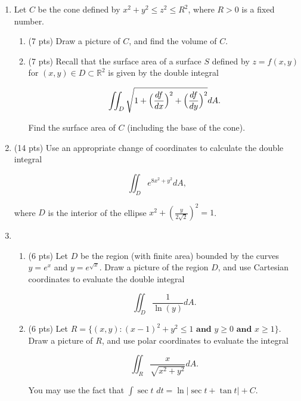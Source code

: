 \documentclass[12 pt]{report}
\begin{document}
\newpage
\begin{enumerate}

\item Let $C$ be the cone defined by $x^2 + y^2 \leq z^2 \leq R^2$, where $R > 0$ is a fixed number.

\begin{enumerate} \item (7 pts) Draw a picture of $C$, and find the volume of $C$. 

\vspace{4in} \item (7 pts) Recall that the surface area of a surface $S$ defined by $z = f(x,y)$ for $(x,y) \in D \subset \mathbb{R}^2$ is given by the double integral 

$$\iint_D \sqrt{1+\Bigl(\frac{df}{dx}\Bigr)^2 + \Bigl(\frac{df}{dy}\Bigr)^2 }dA.$$

Find the surface area of $C$ (including the base of the cone). 
\end{enumerate} 

\newpage

\item (14 pts) Use an appropriate change of coordinates to calculate the double integral 

$$\iint_D e^{8x^2+y^2} dA,$$

where $D$ is the interior of the ellipse $x^2 + (\frac{y}{2\sqrt{2}})^2 = 1$. 

\newpage

\item \begin{enumerate} \item (6 pts) Let $D$ be the region (with finite area) bounded by the curves $y = e^x$ and $y = e^{\sqrt{x}}$. Draw a picture of the region $D$, and use Cartesian coordinates to evaluate the double integral 

$$\iint_D \frac{1}{\ln(y)} dA.$$ 

\vfill \item (6 pts) Let $R = \{(x,y): (x-1)^2 + y^2 \leq 1 \textbf{ and } y \geq 0 \textbf{ and } x \geq 1\}$. Draw a picture of $R$, and use polar coordinates to evaluate the integral 

$$\iint_R \frac{x}{\sqrt{x^2+y^2}} dA.$$

You may use the fact that $\int \sec t$ $ dt = \ln\bigl|\sec t+\tan t\bigr| + C.$
\end{enumerate}

\vfill

\newpage






\end{enumerate}
\end{document}
